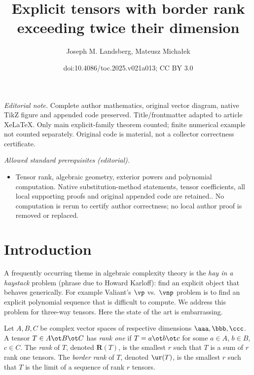 \documentclass[11pt]{article}
\title{Explicit tensors with border rank exceeding twice their dimension}
\author{Joseph M. Landsberg, Mateusz Michałek}
\date{doi:10.4086/toc.2025.v021a013; CC BY 3.0}
\begin{document}
\maketitle
\noindent\textit{Editorial note.} Complete author mathematics, original vector diagram, native TikZ figure and appended code preserved. Title/frontmatter adapted to article XeLaTeX. Only main explicit-family theorem counted; finite numerical example not counted separately. Original code is material, not a collector correctness certificate.\par\medskip
\noindent\textit{Allowed standard prerequisites (editorial).}\begin{itemize}
\item Tensor rank, algebraic geometry, exterior powers and polynomial computation. Native substitution-method statements, tensor coefficients, all local supporting proofs and original appended code are retained.. No computation is rerun to certify author correctness; no local author proof is removed or replaced.
\end{itemize}\medskip
\section{Introduction}
A frequently occurring theme in algebraic complexity theory is the \emph{hay in a haystack}
problem (phrase due to %
Howard Karloff):
find an explicit object that behaves generically. For example Valiant's $\vp$ vs.~$\vnp$
problem is to find an explicit polynomial sequence that is difficult to compute.
We address this problem for three-way tensors. Here the state of the art is embarrassing.


Let $A,B,C$ be complex vector spaces %
of respective  %
dimensions $\aaa,\bbb,\ccc$. A tensor $T\in  A \ot B\ot C$ has \emph{rank one} if $T=a\ot b\ot c$ for some 
$a\in A$, $b\in B$, $c\in C$. The \emph{rank} of $T$, denoted $\mathbf R(T)$, is the 
smallest $r$ such that $T$ is a sum of $r$ rank one tensors.
 The \emph{border 
rank} of $T$, denoted $\ur(T)$, is the smallest $r$ such that $T$ is the limit of a 
sequence of rank $r$ tensors. 
\end{document}
